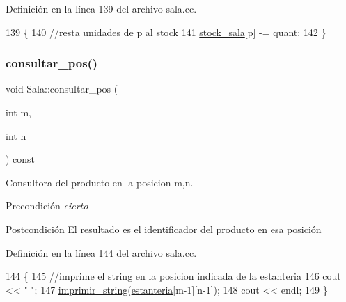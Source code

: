 Definición en la línea 139 del archivo sala.\+cc.


\begin{DoxyCode}
139                                            \{
140     \textcolor{comment}{//resta unidades de p al stock}
141     \mbox{\hyperlink{class_sala_a7c9511997ba4a6fac93625fd3f5c7703}{stock\_sala}}[p] -= quant;
142 \}
\end{DoxyCode}
\mbox{\label{class_sala_a611c18b0ebd5fd9c8ec386809b363d50}} 
\subsubsection{\texorpdfstring{consultar\+\_\+pos()}{consultar\_pos()}}
{\footnotesize\ttfamily void Sala\+::consultar\+\_\+pos (\begin{DoxyParamCaption}\item[{int}]{m,  }\item[{int}]{n }\end{DoxyParamCaption}) const}



Consultora del producto en la posicion m,n. 

\begin{DoxyPrecond}{Precondición}
{\itshape cierto} 
\end{DoxyPrecond}
\begin{DoxyPostcond}{Postcondición}
El resultado es el identificador del producto en esa posición 
\end{DoxyPostcond}


Definición en la línea 144 del archivo sala.\+cc.


\begin{DoxyCode}
144                                           \{
145     \textcolor{comment}{//imprime el string en la posicion indicada de la estanteria}
146     cout << \textcolor{stringliteral}{"  "};
147     \mbox{\hyperlink{sala_8cc_ac1916f29be6c9137b2df1079e26c54f3}{imprimir\_string}}(\mbox{\hyperlink{class_sala_a8f5264818c98db9c0d075c51a7672d95}{estanteria}}[m-1][n-1]);
148     cout << endl;
149 \}
\end{DoxyCode}
\mbox{\label{class_sala_ac1bcf6e4f9a336b505a362468411af20}} 
